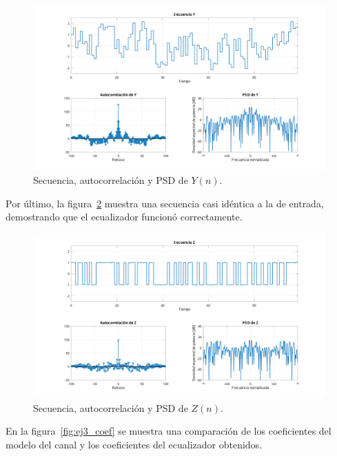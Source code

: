 \begin{figure}[!hbp]
	\centering
	\includegraphics[width=1\linewidth,trim=4cm 0 4cm 0,clip]{img/ej3_y.pdf}
	\caption{Secuencia, autocorrelación y PSD de $Y(n)$.}
	\label{fig:ej3_y}
\end{figure}

Por último, la figura~\ref{fig:ej3_z} muestra una secuencia casi idéntica a la de entrada, demostrando que el ecualizador funcionó correctamente.

\begin{figure}[!hbp]
	\centering
	\includegraphics[width=1\linewidth,trim=4cm 0 4cm 0,clip]{img/ej3_z.pdf}
	\caption{Secuencia, autocorrelación y PSD de $Z(n)$.}
	\label{fig:ej3_z}
\end{figure}

En la figura~\ref{fig:ej3_coef} se muestra una comparación de los coeficientes del modelo del canal y los coeficientes del ecualizador obtenidos.

